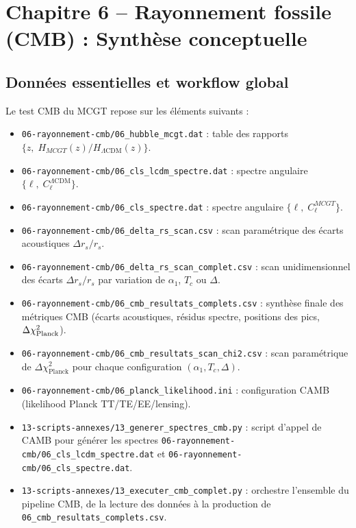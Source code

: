 \section{Chapitre 6 – Rayonnement fossile (CMB) : Synthèse conceptuelle}

\subsection{Données essentielles et workflow global}
Le test CMB du MCGT repose sur les éléments suivants :
\begin{itemize}
  \item \texttt{06-rayonnement-cmb/06\_hubble\_mcgt.dat} : table des rapports 
        \(\{z,\;H_{MCGT}(z)/H_{\Lambda\mathrm{CDM}}(z)\}\).
  \item \texttt{06-rayonnement-cmb/06\_cls\_lcdm\_spectre.dat} : spectre angulaire 
        \(\{\ell,\;C_{\ell}^{\Lambda\mathrm{CDM}}\}\).
  \item \texttt{06-rayonnement-cmb/06\_cls\_spectre.dat} : spectre angulaire 
        \(\{\ell,\;C_{\ell}^{MCGT}\}\).
  \item \texttt{06-rayonnement-cmb/06\_delta\_rs\_scan.csv} : scan paramétrique des écarts acoustiques \(\Delta r_{s}/r_{s}\).
  \item \texttt{06-rayonnement-cmb/06\_delta\_rs\_scan\_complet.csv} : scan unidimensionnel des écarts \(\Delta r_{s}/r_{s}\) par variation de \(\alpha_{1}\), \(T_{c}\) ou \(\Delta\).
  \item \texttt{06-rayonnement-cmb/06\_cmb\_resultats\_complets.csv} : synthèse finale des métriques CMB (écarts acoustiques, résidus spectre, positions des pics, \(\Delta\chi^2_{\rm Planck}\)).
  \item \texttt{06-rayonnement-cmb/06\_cmb\_resultats\_scan\_chi2.csv} : scan paramétrique de \(\Delta\chi^2_{\mathrm{Planck}}\) pour chaque configuration \((\alpha_{1},T_{c},\Delta)\).
  \item \texttt{06-rayonnement-cmb/06\_planck\_likelihood.ini} : configuration CAMB (likelihood Planck TT/TE/EE/lensing).
  \item \texttt{13-scripts-annexes/13\_generer\_spectres\_cmb.py} : script d’appel de CAMB pour générer les spectres 
        \texttt{06-rayonnement-cmb/06\_cls\_lcdm\_spectre.dat} et \texttt{06-rayonnement-cmb/06\_cls\_spectre.dat}.
  \item \texttt{13-scripts-annexes/13\_executer\_cmb\_complet.py} : orchestre l’ensemble du pipeline CMB, de la lecture des données à la production de \texttt{06\_cmb\_resultats\_complets.csv}.
\end{itemize}

